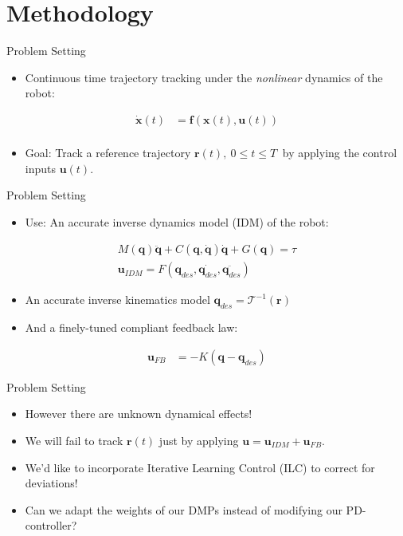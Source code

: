 \documentclass[handout]{beamer}
\newcommand{\invKin}{\mathcal{T}^{-1}} %
\newcommand{\state}{\mathbf{x}} %
\newcommand{\joint}{\mathbf{q}} %
\newcommand{\traj}{\mathbf{r}} %
\newcommand{\sysInput}{\mathbf{u}} %
\begin{document}
\section{Methodology}
%
\begin{frame}{Problem Setting}
\begin{itemize}
\item Continuous time trajectory tracking under the \emph{nonlinear} dynamics of the robot: \pause
\end{itemize}
\begin{equation*}
\begin{aligned}
\dot{\state}(t) &= \mathbf{f}(\state(t),\sysInput(t)) \\
\end{aligned}
\end{equation*}
\begin{itemize}
\item Goal: Track a reference trajectory $\traj(t), \ 0 \leq t \leq T \ $ by applying the control inputs $\sysInput(t)$. \pause
\end{itemize}
\end{frame}
%
\begin{frame}{Problem Setting}
\begin{itemize}
\item Use: An accurate inverse dynamics model (IDM) of the robot: \pause
\end{itemize}
\begin{equation*}
\begin{aligned}
M(\joint)\ddot{\joint} + C(\joint,\dot{\joint})\dot{\joint} + G(\joint) = \tau \\
\sysInput_{IDM} = F(\joint_{des},\dot{\joint_{des}},\ddot{\joint_{des}})
\end{aligned}
\end{equation*}
\pause 
\begin{itemize}
\item An accurate inverse kinematics model $\joint_{des} = \invKin(\traj)$ \pause
\item And a finely-tuned compliant feedback law: \pause
\end{itemize}
\begin{equation*}
\begin{aligned}
\sysInput_{FB} &= -K(\joint - \joint_{des})
\end{aligned}
\end{equation*}
\end{frame}
%
\begin{frame}{Problem Setting}
\begin{itemize}	
\item However there are unknown dynamical effects! \pause
\item We will fail to track $\traj(t)$ just by applying $\sysInput = \sysInput_{IDM} + \sysInput_{FB}$. \pause
\item We'd like to incorporate Iterative Learning Control (ILC) to correct for deviations! \pause
\item Can we adapt the weights of our DMPs instead of modifying our PD-controller?
\end{itemize}
\end{frame}
\end{document}
